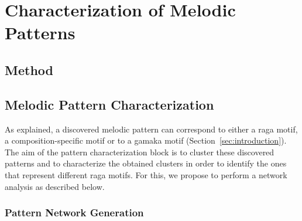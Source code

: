 %


\section{Characterization of Melodic Patterns}
\label{sec:patterns_characterization_of_melodic_patterns}


\subsection{Method}

\subsection{Melodic Pattern Characterization}
\label{pattern_characterization}

As explained, a discovered melodic pattern can correspond to either a \gls{raga} motif, a composition-specific motif or to a gamaka motif (Section~\ref{sec:introduction}). The aim of the pattern characterization block is to cluster these discovered patterns and to characterize the obtained clusters in order to identify the ones that represent different \gls{raga} motifs. For this, we propose to perform a network analysis as described below.

\subsubsection{Pattern Network Generation}
\label{sec:network_generation}

